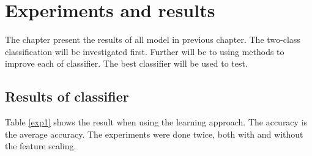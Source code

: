 \documentclass[USenglish]{ifimaster}  %
\begin{document}
\chapter{Experiments and results}                     %
The chapter present the results of all model in previous chapter. The two-class classification will be investigated first. Further will be to using methods to improve each of classifier. The best classifier will be used to test. 

\section{Results of classifier}\label{result_exp1}
Table \ref{exp1} shows the result when using the learning approach. The accuracy is the average accuracy. The experiments were done twice, both with and without the feature scaling. 
\end{document}
